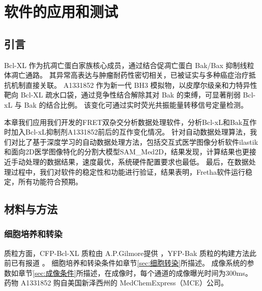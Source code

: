 \chapter{软件的应用和测试}

\section{引言}
\ifshowtext

Bcl-XL 作为抗凋亡蛋白家族核心成员，通过结合促凋亡蛋白 Bak/Bax 抑制线粒体凋亡通路。
其异常高表达与肿瘤耐药性密切相关，已被证实与多种癌症治疗抵抗机制直接关联。
A1331852 作为新一代 BH3 模拟物，以皮摩尔级亲和力特异性靶向 Bcl-XL 疏水口袋，通过竞争性结合解除其对 Bak 的束缚，可显著削弱 Bcl-xL 与 Bak 的结合比例。
该变化可通过实时荧光共振能量转移信号定量检测。

本章我们应用我们开发的FRET双杂交分析数据处理软件，分析Bcl-xL和Bak互作时加入Bcl-xL抑制剂A1331852前后的互作变化情况。
针对自动数据处理算法，我们对比了基于深度学习的自动数据处理方法，包括交互式医学图像分析软件ilastik和面向2D医学图像特化的分割大模型SAM\_Med2D，结果发现，计算结果也更接近手动处理的数据结果，速度最优，系统硬件配置要求也最低。
最后，在数据处理过程中，我们对软件的稳定性和功能进行验证，结果表明，Fretha软件运行稳定，所有功能符合预期。

\fi

\section{材料与方法}

\subsection{细胞培养和转染}
质粒方面，CFP-Bcl-XL 质粒由 A.P.Gilmore提供 ，YFP-Bak 质粒的构建方法此前已有报道 。
细胞培养和转染条件如章节\ref{sec:细胞转染}所描述。
成像系统的参数如章节\ref{sec:成像条件}所描述，在成像时，每个通道的成像曝光时间为300ms。
药物 A1331852 购自美国新泽西州的 MedChemExpress（MCE）公司。

